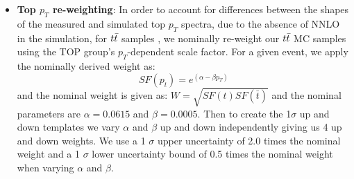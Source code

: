 \begin{itemize}
\item \textbf{Top $p_T$ re-weighting}: In order to account for differences between the shapes of the measured and simulated top $p_T$ spectra, due to the absence of NNLO in the simulation, for $t\bar{t} $ samples \cite{top-pog}, we nominally re-weight our $t\bar{t} $ MC samples using the TOP group’s $p_T$-dependent scale factor. For a given event, we apply the nominally derived weight as:
\begin{equation}
SF(p_t) = e^{(\alpha-\beta p_T)}
\end{equation}
and the nominal weight is given as: $W = \sqrt{SF(t)SF(\bar{t})}$ and the nominal parameters are $\alpha = 0.0615$ and $\beta = 0.0005$. Then to create the 1$\sigma$ up and down templates we vary $\alpha$ and $\beta$ up and down independently giving us 4 up and down weights. We use a 1 $\sigma$ upper uncertainty of 2.0 times the nominal weight and a 1 $\sigma$ lower uncertainty bound of 0.5 times the nominal weight when varying $\alpha$ and $\beta$.



\end{itemize}
